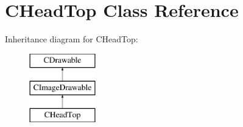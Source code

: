 \hypertarget{class_c_head_top}{}\section{C\+Head\+Top Class Reference}
\label{class_c_head_top}
Inheritance diagram for C\+Head\+Top\+:\begin{figure}[H]
\begin{center}
\leavevmode
\includegraphics[height=3.000000cm]{class_c_head_top}
\end{center}
\end{figure}
